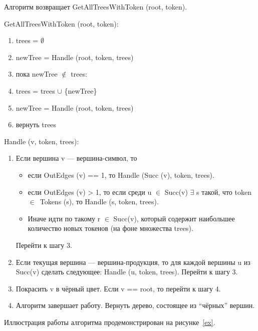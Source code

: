 Алгоритм возвращает GetAllTreesWithToken (root, token).

GetAllTreesWithToken (root, token):
\begin{enumerate}
\item trees = $\emptyset$
\item newTree = Handle (root, token, trees)
\item пока newTree $\notin$ trees:
\item \qquad trees = trees $\cup$ \{newTree\}
\item \qquad newTree = Handle (root, token, trees)
\item вернуть trees
\end{enumerate}		
		
Handle (v, token, trees):
\begin{enumerate}
\item Если вершина v --- вершина-символ, то 
    \begin{itemize}
        \item если OutEdges (v) == 1, то Handle (Succ (v), token, trees).
        \item если OutEdges (v) > 1, то если среди u $\in$ Succ(v) $\exists$ s такой, что token $\in$~Tokens (s), то Handle (s, token, trees). 
        \item Иначе идти по такому r $\in$ Succ(v), который содержит наибольшее количество новых токенов (на фоне множества trees). 
	\end{itemize}
	Перейти к шагу 3.
\item Если текущая вершина --- вершина-продукция, то для каждой вершины u из Succ(v) сделать следующее:  Handle (u, token, trees). Перейти к шагу 3.
\item Покрасить v в чёрный цвет. Если v == root, то перейти к шагу 4.
\item Алгоритм завершает работу. Вернуть дерево, состоящее из ``чёрных'' вершин. 
\end{enumerate}

Иллюстрация работы алгоритма продемонстрирован на рисунке~\ref{ex}.

